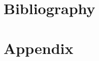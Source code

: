 \documentclass[10pt]{iopart}
\begin{document}
%

\section{Bibliography}




\appendix
\section{Appendix}

\end{document}
